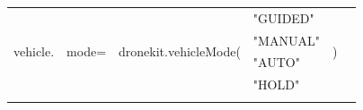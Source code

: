 \documentclass[a4paper, 10pt]{article}
\begin{document}
\begin{enumerate}
\begin{table}[]
\begin{tabular}{lcllll}
\multirow{4}{*}{vehicle.}                 & \multicolumn{1}{l}{\multirow{4}{*}{mode=}}                                                                          & \multirow{4}{*}{dronekit.vehicleMode(}                                                         & "GUIDED"                                               & \multirow{4}{*}{)}    &  \\
                                          & \multicolumn{1}{l}{}                                                                                                &                                                                                                & "MANUAL"                                               &                       &  \\
                                          & \multicolumn{1}{l}{}                                                                                                &                                                                                                & "AUTO"                                                 &                       &  \\
                                          & \multicolumn{1}{l}{}                                                                                                &                                                                                                & "HOLD"                                                 &                       &  \\ \cline{1-5}
                                          & \multicolumn{1}{l}{}                                                                                                &                                                                                                &                                                        &                       & 
\end{tabular}
\end{table} 

\end{enumerate}
\end{document}
